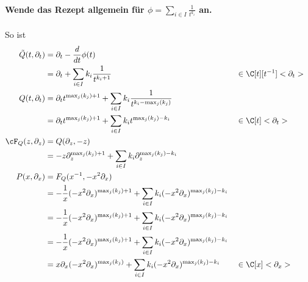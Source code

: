\paragraph{Wende das Rezept allgemein für 
$\phi=\sum_{i\in I}\frac{1}{t^{k_i}}$ an.}
So ist 
\begin{align*}
\tilde Q(t,\partial_t) &=\partial_t-\frac{d}{dt}\phi(t) \\
                       &=\partial_t+\sum_{i\in I} k_i\frac{1}{t^{k_i+1}} 
                       & &\in \C[t][t^{-1}]<\partial_t>\\
Q(t,\partial_t)        &=\partial_tt^{\max_j(k_j)+1}
                         +\sum_{i\in I} k_i\frac{1}{t^{k_i-\max_j(k_j)}} \\
                       &=\partial_tt^{\max_j(k_j)+1}
                         +\sum_{i\in I} k_it^{\max_j(k_j)-k_i} 
                       & &\in \C[t]<\partial_t>\\
\cF_Q(z,\partial_z)    &=Q(\partial_z,-z)\\
                       &=-z\partial_z^{\max_j(k_j)+1}
                         +\sum_{i\in I} k_i\partial_z^{\max_j(k_j)-k_i} \\
P(x,\partial_x)        &=F_Q(x^{-1},-x^2\partial_x) \\
                       &=-\frac{1}{x}(-x^2\partial_x)^{\max_j(k_j)+1}
                         +\sum_{i\in I} k_i(-x^2\partial_x)^{\max_j(k_j)-k_i}\\
                       &=-\frac{1}{x}(-x^2\partial_x)^{\max_j(k_j)+1}
                         +\sum_{i\in I} k_i(-x^2\partial_x)^{\max_j(k_j)-k_i}\\
                       &=-\frac{1}{x}(-x^2\partial_x)^{\max_j(k_j)+1}
                         +\sum_{i\in I} k_i(-x^2\partial_x)^{\max_j(k_j)-k_i}\\
                       &=x\partial_x(-x^2\partial_x)^{\max_j(k_j)}
                         +\sum_{i\in I} k_i(-x^2\partial_x)^{\max_j(k_j)-k_i}
                       & &\in \C[x]<\partial_x>
\end{align*}

